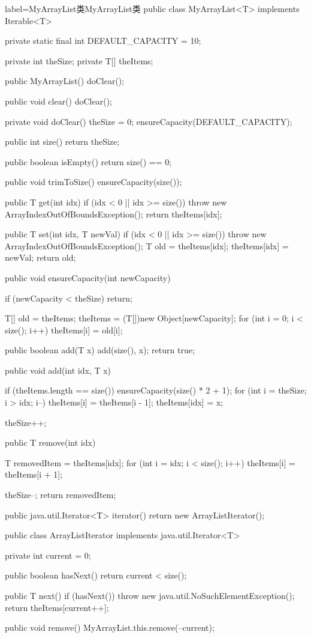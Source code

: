 \documentclass[oneside]{ctexbook}
\begin{document}
\begin{myjava}{label={MyArrayList类}}{MyArrayList类}
public class MyArrayList<T> implements Iterable<T> {
    private static final int DEFAULT_CAPACITY = 10;

    private int theSize;
    private T[] theItems;

    public MyArrayList() {
        doClear();
    }

    public void clear() {
        doClear();
    }

    private void doClear() {
        theSize = 0;
        ensureCapacity(DEFAULT_CAPACITY);
    }

    public int size() {
        return theSize;
    }

    public boolean isEmpty() {
        return size() == 0;
    }

    public void trimToSize() {
        ensureCapacity(size());
    }

    public T get(int idx) {
        if (idx < 0 || idx >= size())
            throw new ArrayIndexOutOfBoundsException();
        return theItems[idx];
    }

    public T set(int idx, T newVal) {
        if (idx < 0 || idx >= size())
            throw new ArrayIndexOutOfBoundsException();
        T old = theItems[idx];
        theItems[idx] = newVal;
        return old;
    }

    public void ensureCapacity(int newCapacity) {
        if (newCapacity < theSize) return;

        T[] old = theItems;
        theItems = (T[])new Object[newCapacity];
        for (int i = 0; i < size(); i++)
            theItems[i] = old[i];
    }

    public boolean add(T x) {
        add(size(), x);
        return true;
    }

    public void add(int idx, T x) {
        if (theItems.length == size())
            ensureCapacity(size() * 2 + 1);
        for (int i = theSize; i > idx; i--)
            theItems[i] = theItems[i - 1];
        theItems[idx] = x;

        theSize++;
    }

    public T remove(int idx) {
        T removedItem = theItems[idx];
        for (int i = idx; i < size(); i++)
            theItems[i] = theItems[i + 1];

        theSize--;
        return removedItem;
    }

    public java.util.Iterator<T> iterator() {
        return new ArrayListIterator();
    }

    public class ArrayListIterator implements java.util.Iterator<T> {
        private int current = 0;

        public boolean hasNext() {
            return current < size();
        }

        public T next() {
            if (hasNext())
                throw new java.util.NoSuchElementException();
            return theItems[current++];
        }

        public void remove() {
            MyArrayList.this.remove(--current);
        }
    }

}
\end{myjava}
\end{document}
